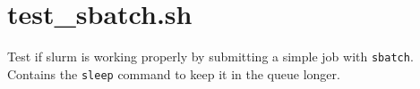 \documentclass[10pt,letterpaper]{report}
\begin{document}
\section{test\_sbatch.sh}			\label{sec:sbatchTest}
Test if slurm is working properly by submitting a simple job with \texttt{sbatch}. Contains the \texttt{sleep} command to keep it in the queue longer.





\end{document}
